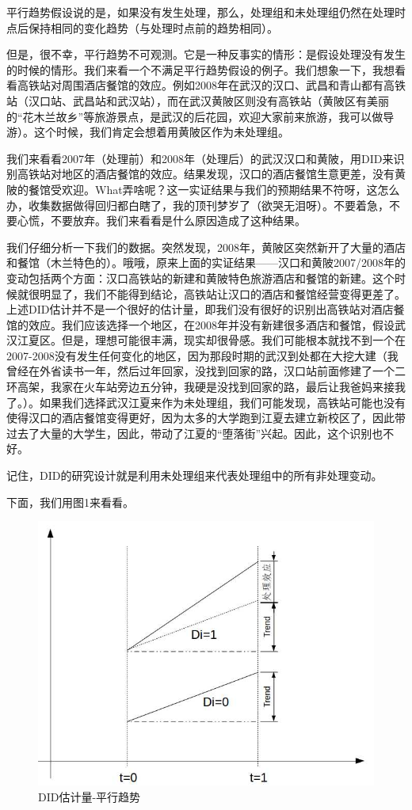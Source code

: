\documentclass[cn,10pt,math=newtx,citestyle=gb7714-2015,bibstyle=gb7714-2015]{elegantbook}
\begin{document}
	平行趋势假设说的是，如果没有发生处理，那么，处理组和未处理组仍然在处理时点后保持相同的变化趋势（与处理时点前的趋势相同）。
	
	但是，很不幸，平行趋势不可观测。它是一种反事实的情形：是假设处理没有发生的时候的情形。我们来看一个不满足平行趋势假设的例子。我们想象一下，我想看看高铁站对周围酒店餐馆的效应。例如2008年在武汉的汉口、武昌和青山都有高铁站（汉口站、武昌站和武汉站），而在武汉黄陂区则没有高铁站（黄陂区有美丽的“花木兰故乡”等旅游景点，是武汉的后花园，欢迎大家前来旅游，我可以做导游）。这个时候，我们肯定会想着用黄陂区作为未处理组。
	
	我们来看看2007年（处理前）和2008年（处理后）的武汉汉口和黄陂，用DID来识别高铁站对地区的酒店餐馆的效应。结果发现，汉口的酒店餐馆生意更差，没有黄陂的餐馆受欢迎。What弄啥呢？这一实证结果与我们的预期结果不符呀，这怎么办，收集数据做得回归都白瞎了，我的顶刊梦岁了（欲哭无泪呀）。不要着急，不要心慌，不要放弃。我们来看看是什么原因造成了这种结果。
	
	我们仔细分析一下我们的数据。突然发现，2008年，黄陂区突然新开了大量的酒店和餐馆（木兰特色的）。哦哦，原来上面的实证结果——汉口和黄陂2007/2008年的变动包括两个方面：汉口高铁站的新建和黄陂特色旅游酒店和餐馆的新建。这个时候就很明显了，我们不能得到结论，高铁站让汉口的酒店和餐馆经营变得更差了。上述DID估计并不是一个很好的估计量，即我们没有很好的识别出高铁站对酒店餐馆的效应。我们应该选择一个地区，在2008年并没有新建很多酒店和餐馆，假设武汉江夏区。但是，理想可能很丰满，现实却很骨感。我们可能根本就找不到一个在2007-2008没有发生任何变化的地区，因为那段时期的武汉到处都在大挖大建（我曾经在外省读书一年，然后过年回家，没找到回家的路，汉口站前面修建了一个二环高架，我家在火车站旁边五分钟，我硬是没找到回家的路，最后让我爸妈来接我了。）。如果我们选择武汉江夏来作为未处理组，我们可能发现，高铁站可能也没有使得汉口的酒店餐馆变得更好，因为太多的大学跑到江夏去建立新校区了，因此带过去了大量的大学生，因此，带动了江夏的“堕落街”兴起。因此，这个识别也不好。
	
	记住，DID的研究设计就是利用未处理组来代表处理组中的所有非处理变动。
	
	
	下面，我们用图1来看看。
	\begin{figure}[htbp]
		\centering
		\includegraphics[width=1\textwidth]{commontrend.jpg}
		\caption{DID估计量-平行趋势}\label{fig:digit}
	\end{figure}
	
\end{document}
